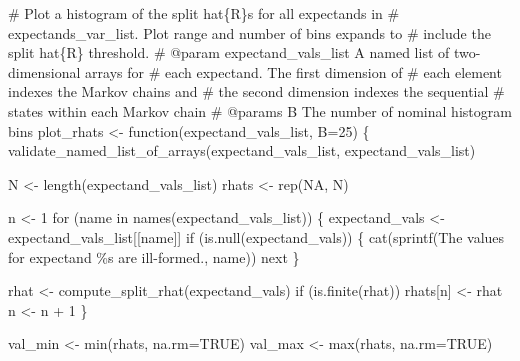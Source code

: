 \documentclass[
  letterpaper,
  DIV=11,
  numbers=noendperiod]{scrartcl}
\newenvironment{Shaded}{\begin{snugshade}}{\end{snugshade}}
\newcommand{\BuiltInTok}[1]{\textcolor[rgb]{0.00,0.23,0.31}{#1}}
\newcommand{\CommentTok}[1]{\textcolor[rgb]{0.37,0.37,0.37}{#1}}
\newcommand{\ControlFlowTok}[1]{\textcolor[rgb]{0.00,0.23,0.31}{#1}}
\newcommand{\DecValTok}[1]{\textcolor[rgb]{0.68,0.00,0.00}{#1}}
\newcommand{\KeywordTok}[1]{\textcolor[rgb]{0.00,0.23,0.31}{#1}}
\newcommand{\NormalTok}[1]{\textcolor[rgb]{0.00,0.23,0.31}{#1}}
\newcommand{\OperatorTok}[1]{\textcolor[rgb]{0.37,0.37,0.37}{#1}}
\newcommand{\SpecialCharTok}[1]{\textcolor[rgb]{0.37,0.37,0.37}{#1}}
\newcommand{\StringTok}[1]{\textcolor[rgb]{0.13,0.47,0.30}{#1}}
\begin{document}
\begin{Shaded}
\begin{Highlighting}[]
\CommentTok{\# Plot a histogram of the split hat\{R\}s for all expectands in}
\CommentTok{\# expectands\_var\_list.  Plot range and number of bins expands to}
\CommentTok{\# include the split hat\{R\} threshold.}
\CommentTok{\# @param expectand\_vals\_list A named list of two{-}dimensional arrays for}
\CommentTok{\#                            each expectand.  The first dimension of}
\CommentTok{\#                            each element indexes the Markov chains and}
\CommentTok{\#                            the second dimension indexes the sequential}
\CommentTok{\#                            states within each Markov chain}
\CommentTok{\# @params B The number of nominal histogram bins}
\NormalTok{plot\_rhats }\OperatorTok{\textless{}{-}}\NormalTok{ function(expectand\_vals\_list, B}\OperatorTok{=}\DecValTok{25}\NormalTok{) \{}
\NormalTok{  validate\_named\_list\_of\_arrays(expectand\_vals\_list,}
                                \StringTok{\textquotesingle{}expectand\_vals\_list\textquotesingle{}}\NormalTok{)}

\NormalTok{  N }\OperatorTok{\textless{}{-}}\NormalTok{ length(expectand\_vals\_list)}
\NormalTok{  rhats }\OperatorTok{\textless{}{-}}\NormalTok{ rep(NA, N)}

\NormalTok{  n }\OperatorTok{\textless{}{-}} \DecValTok{1}
  \ControlFlowTok{for}\NormalTok{ (name }\KeywordTok{in}\NormalTok{ names(expectand\_vals\_list)) \{}
\NormalTok{    expectand\_vals }\OperatorTok{\textless{}{-}}\NormalTok{ expectand\_vals\_list[[name]]}
    \ControlFlowTok{if}\NormalTok{ (}\KeywordTok{is}\NormalTok{.null(expectand\_vals)) \{}
\NormalTok{      cat(sprintf(}\StringTok{\textquotesingle{}The values for expectand \textasciigrave{}}\SpecialCharTok{\%s}\StringTok{\textasciigrave{} are ill{-}formed.\textquotesingle{}}\NormalTok{,}
\NormalTok{                  name))}
      \BuiltInTok{next}
\NormalTok{    \}}

\NormalTok{    rhat }\OperatorTok{\textless{}{-}}\NormalTok{ compute\_split\_rhat(expectand\_vals)}
    \ControlFlowTok{if}\NormalTok{ (}\KeywordTok{is}\NormalTok{.finite(rhat))}
\NormalTok{      rhats[n] }\OperatorTok{\textless{}{-}}\NormalTok{ rhat}
\NormalTok{    n }\OperatorTok{\textless{}{-}}\NormalTok{ n }\OperatorTok{+} \DecValTok{1}
\NormalTok{  \}}

\NormalTok{  val\_min }\OperatorTok{\textless{}{-}} \BuiltInTok{min}\NormalTok{(rhats, na.rm}\OperatorTok{=}\NormalTok{TRUE)}
\NormalTok{  val\_max }\OperatorTok{\textless{}{-}} \BuiltInTok{max}\NormalTok{(rhats, na.rm}\OperatorTok{=}\NormalTok{TRUE)}


\end{Highlighting}
\end{Shaded}
\end{document}
